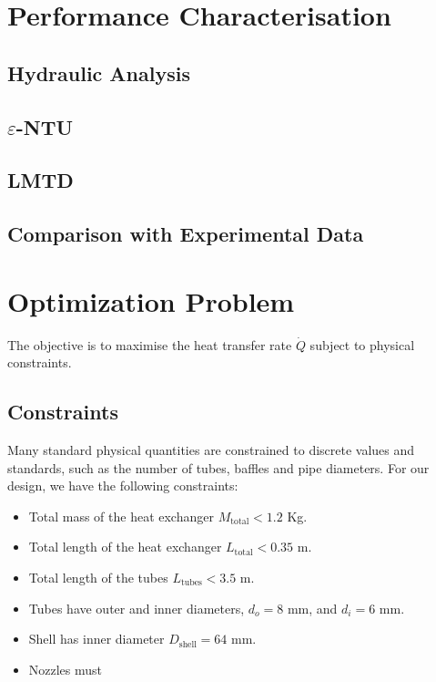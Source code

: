 \documentclass{article}
\begin{document}

\section{Performance Characterisation}

\subsection{Hydraulic Analysis}


\subsection{$\varepsilon$-NTU}

\subsection{LMTD}

\subsection{Comparison with Experimental Data}

\section{Optimization Problem}

The objective is to maximise the heat transfer rate $\dot{Q}$ subject to physical constraints.

\subsection{Constraints}

Many standard physical quantities are constrained to discrete values and standards, such as the number of tubes, baffles and pipe diameters.
For our design, we have the following constraints:
\begin{itemize}
  \item Total mass of the heat exchanger $M_{\text{total}} < 1.2$ Kg.
  \item Total length of the heat exchanger $L_{\text{total}} < 0.35$ m.
  \item Total length of the tubes $L_{\text{tubes}} < 3.5$ m.
  \item Tubes have outer and inner diameters, $d_{o} = 8$ mm, and $d_{i} = 6$ mm.
  \item Shell has inner diameter $D_{\text{shell}} = 64$ mm.
  \item Nozzles must 
\end{itemize}
\end{document}
